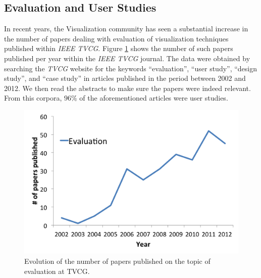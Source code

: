 


\subsection{Evaluation and User Studies}

In recent years, the Visualization community has seen a substantial increase in the number of papers dealing with evaluation of visualization techniques published within {\em IEEE TVCG}.  Figure \ref{fig:tvcg} shows the number of such papers published per year within the {\em IEEE TVCG} journal. The data were obtained by searching the {\em TVCG} website for the keywords ``evaluation'', ``user study'', ``design study'', and ``case study'' in articles published in the period between 2002 and 2012. We then read the abstracts to make sure the papers were indeed relevant. From this corpora, $96\%$ of the aforementioned articles were user studies.

\begin{figure}[t]
\centering
\includegraphics[width=0.5\linewidth]{chapter6/figures/evaluation_tvcg.png}
  \caption{\label{fig:tvcg}Evolution of the number of papers published on the topic of evaluation at TVCG.}
\end{figure}

